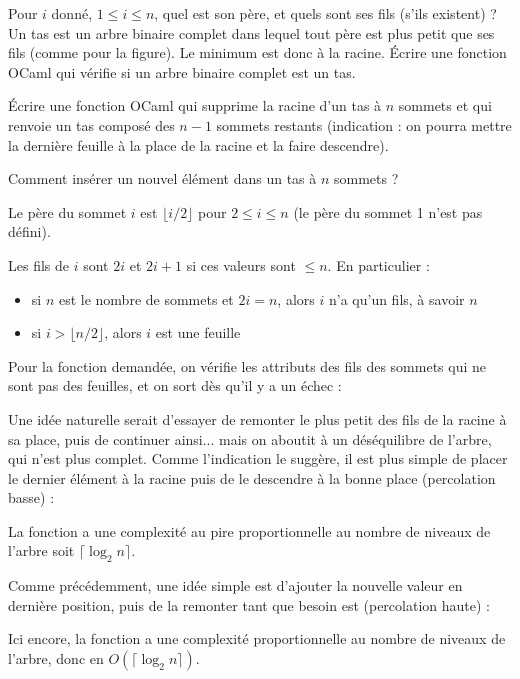 \Q
Pour $i$ donné, $1 \leq i \leq n$, quel est son père, et quels sont ses fils (s'ils existent) ? Un tas est un arbre binaire complet dans lequel tout père est plus petit que ses fils (comme pour la figure). Le minimum est donc à la racine. Écrire une fonction OCaml qui vérifie si un arbre binaire complet est un tas.

\Q
Écrire une fonction OCaml qui supprime la racine d'un tas à $n$ sommets et qui renvoie un tas composé des $n-1$ sommets restants (indication : on pourra mettre la dernière feuille à la place de la racine et la faire descendre).

\Q
Comment insérer un nouvel élément dans un tas à $n$ sommets ?

\Corrige

\Q
Le père du sommet $i$ est $\lfloor i/2 \rfloor$ pour $2 \leq i \leq n$ (le père du sommet 1 n'est pas défini).
\smallskip

Les fils de $i$ sont $2i$ et $2i+1$ si ces valeurs sont $\leq n$. En particulier :
\begin{itemize}
    \item si $n$ est le nombre de sommets et $2i=n$, alors $i$ n'a qu'un fils, à savoir $n$
    \item si $i>\lfloor n/2 \rfloor$, alors $i$ est une feuille
\end{itemize}
Pour la fonction demandée, on vérifie les attributs des fils des sommets qui ne sont pas des feuilles, et on sort dès qu'il y a un échec :



\Q
Une idée naturelle serait d'essayer de remonter le plus petit des fils de la racine à sa place, puis de continuer ainsi... mais on aboutit à un déséquilibre de l'arbre, qui n'est plus complet. Comme l'indication le suggère, il est plus simple de placer le dernier élément à la racine puis de le descendre à la bonne place (percolation basse) :



La fonction a une complexité au pire proportionnelle au nombre de niveaux de l'arbre soit $\lceil \log_2n\rceil$.

\Q
Comme précédemment, une idée simple est d'ajouter la nouvelle valeur en dernière position, puis de la remonter tant que besoin est (percolation haute) :



Ici encore, la fonction a une complexité proportionnelle au nombre de niveaux de l'arbre, donc en $O(\lceil \log_2n \rceil)$.
\medskip

